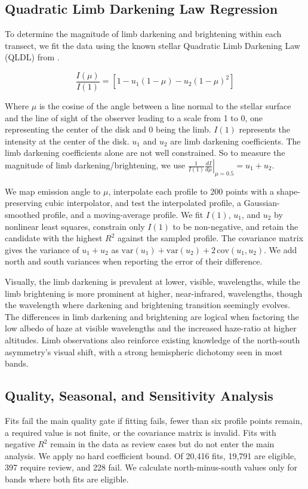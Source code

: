 \documentclass[tighten,linenumbers,twocolumn]{aastex631}
\begin{document}
\subsection{Quadratic Limb Darkening Law Regression}
To determine the magnitude of limb darkening and brightening within each transect, we fit the data using the known stellar Quadratic Limb Darkening Law (QLDL) from \cite{kopal1950limb, brown2001hubble}. 

\begin{equation}
    \frac{I(\mu)}{I(1)} = \left[1 - u_{1}(1 - \mu) - u_{2}(1 - \mu)^2\right]
\end{equation}

Where $\mu$ is the cosine of the angle between a line normal to the stellar surface and the line of sight of the observer leading to a scale from 1 to 0, one representing the center of the disk and 0 being the limb. $I(1)$ represents the intensity at the center of the disk. $u_{1}$ and $u_{2}$ are limb darkening coefficients. The limb darkening coefficients alone are not well constrained. So to measure the magnitude of limb darkening/brightening, we use $\left.\frac{1}{I(1)}\frac{dI}{d\mu}\right|_{\mu=0.5} = u_{1} + u_{2}$.

We map emission angle to $\mu$, interpolate each profile to 200 points with a shape-preserving cubic interpolator, and test the interpolated profile, a Gaussian-smoothed profile, and a moving-average profile. We fit $I(1)$, $u_1$, and $u_2$ by nonlinear least squares, constrain only $I(1)$ to be non-negative, and retain the candidate with the highest $R^2$ against the sampled profile. The covariance matrix gives the variance of $u_1+u_2$ as $\mathrm{var}(u_1)+\mathrm{var}(u_2)+2\,\mathrm{cov}(u_1,u_2)$. We add north and south variances when reporting the error of their difference.

Visually, the limb darkening is prevalent at lower, visible, wavelengths, while the limb brightening is more prominent at higher, near-infrared, wavelengths, though the wavelength where darkening and brightening transition seemingly evolves. The differences in limb darkening and brightening are logical when factoring the low albedo of haze at visible wavelengths and the increased haze-ratio at higher altitudes. Limb observations also reinforce existing knowledge of the north-south asymmetry's visual shift, with a strong hemispheric dichotomy seen in most bands.


\subsection{Quality, Seasonal, and Sensitivity Analysis}
Fits fail the main quality gate if fitting fails, fewer than six profile points remain, a required value is not finite, or the covariance matrix is invalid. Fits with negative $R^2$ remain in the data as review cases but do not enter the main analysis. We apply no hard coefficient bound. Of 20,416 fits, 19,791 are eligible, 397 require review, and 228 fail. We calculate north-minus-south values only for bands where both fits are eligible.
\end{document}
